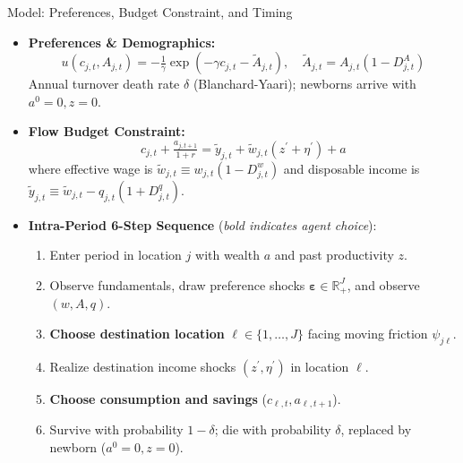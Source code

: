 \documentclass[aspectratio=169, 10pt]{beamer}
\begin{document}
\begin{frame}{Model: Preferences, Budget Constraint, and Timing \hfill \hyperlink{backup:rouwenhorst}{\scriptsize{}}}\label{main:preferences}
    \begin{itemize}\small\setlength{\itemsep}{3pt}
        \item \textbf{Preferences \& Demographics:}
        $$u(c_{j,t}, A_{j,t}) = -\tfrac{1}{\gamma} \exp\left(-\gamma c_{j,t} - \tilde{A}_{j,t}\right), \quad \tilde{A}_{j,t} = A_{j,t}(1 - D^A_{j,t})$$
        Annual turnover death rate $\delta$ (Blanchard-Yaari); newborns arrive with $a^0 = 0, z=0$.
        \item \textbf{Flow Budget Constraint:}
        $$c_{j,t} + \tfrac{a_{j,t+1}}{1 + r} = \tilde{y}_{j,t} + \tilde{w}_{j,t}(z^\prime + \eta^\prime) + a$$
        where effective wage is $\tilde{w}_{j,t} \equiv w_{j,t}(1-D^w_{j,t})$ and disposable income is $\tilde{y}_{j,t} \equiv \tilde{w}_{j,t} - q_{j,t}(1+D^q_{j,t})$.
        \item \textbf{Intra-Period 6-Step Sequence} (\textit{bold indicates agent choice}):
        \begin{enumerate}\footnotesize\setlength{\itemsep}{1pt}
            \item Enter period in location $j$ with wealth $a$ and past productivity $z$.
            \item Observe fundamentals, draw preference shocks $\boldsymbol{\varepsilon} \in \mathbb{R}^J_+$, and observe $(w, A, q)$.
            \item \textbf{Choose destination location} $\ell \in \{1,\dots,J\}$ facing moving friction $\psi_{j\ell}$.
            \item Realize destination income shocks $(z^\prime, \eta^\prime)$ in location $\ell$.
            \item \textbf{Choose consumption and savings} ($c_{\ell,t}, a_{\ell,t+1}$).
            \item Survive with probability $1-\delta$; die with probability $\delta$, replaced by newborn ($a^0=0, z=0$).
        \end{enumerate}
    \end{itemize}
    \vspace{0.06cm}
\end{frame}
\end{document}
